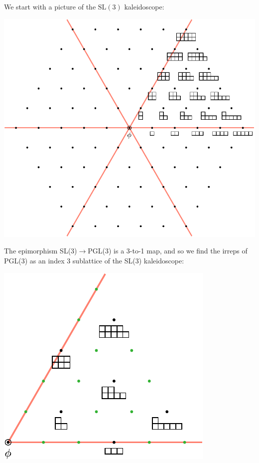 \documentclass[11pt,oneside]{article}
\newcommand{\SL}{\mathrm{SL}}
\begin{document}
We start with a picture of the $\SL(3)$ kaleidoscope:
\begin{center}
\includegraphics[scale=0.8]{images/sl3.pdf}
\end{center}

The epimorphism SL(3)$\to$PGL(3) is a 3-to-1 map,
and so we find the irreps of PGL(3) as an index 3 
sublattice of the SL(3) kaleidoscope:
\begin{center}
\includegraphics[scale=0.8]{images/pgl3.pdf}
\end{center}
\end{document}
